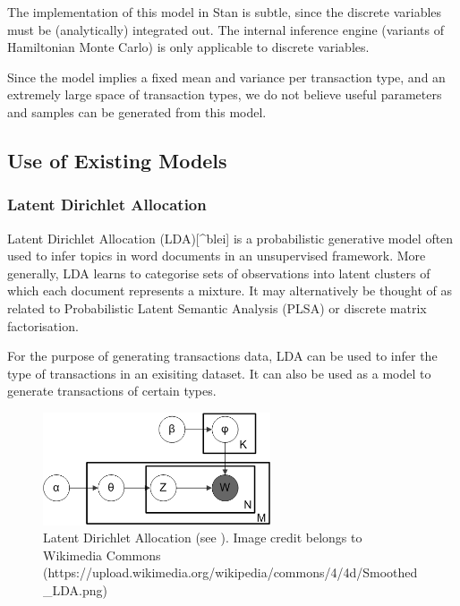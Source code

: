 \documentclass[]{article}
\begin{document}
The implementation of this model in Stan is subtle, since the discrete
variables must be (analytically) integrated out. The internal inference
engine (variants of Hamiltonian Monte Carlo) is only applicable to
discrete variables.

Since the model implies a fixed mean and variance per transaction type,
and an extremely large space of transaction types, we do not believe
useful parameters and samples can be generated from this model.

\subsection{Use of Existing Models}\label{use-of-existing-models}

\subsubsection{Latent Dirichlet
Allocation}\label{latent-dirichlet-allocation}

Latent Dirichlet Allocation (LDA){[}\^{}blei{]} is a probabilistic
generative model often used to infer topics in word documents in an
unsupervised framework. More generally, LDA learns to categorise sets of
observations into latent clusters of which each document represents a
mixture. It may alternatively be thought of as related to Probabilistic
Latent Semantic Analysis (PLSA) or discrete matrix factorisation.

For the purpose of generating transactions data, LDA can be used to
infer the type of transactions in an exisiting dataset. It can also be
used as a model to generate transactions of certain types.

\begin{figure}
    \centering
    \includegraphics[width=0.6\textwidth]{uploads/Smoothed_LDA.png}
    \caption{Latent Dirichlet Allocation (see \citep{blei2003latent}). Image credit belongs to Wikimedia Commons (https://upload.wikimedia.org/wikipedia/commons/4/4d/Smoothed\_LDA.png)}
    \label{fig:lda}
\end{figure}
\end{document}
